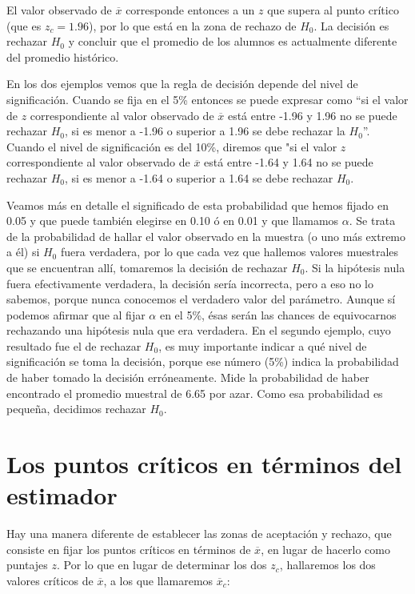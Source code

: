 \documentclass[]{book}
\begin{document}
El valor observado de \(\overline{x}\) corresponde entonces a un \(z\) que
supera al punto crítico (que es \(z_{c}=1.96\)), por lo que está en la zona de rechazo de \(H_{0}\). La decisión es rechazar \(H_{0}\) y concluir que el promedio de los alumnos es actualmente diferente del promedio histórico.

En los dos ejemplos vemos que la regla de decisión depende del nivel de
significación. Cuando se fija en el 5\% entonces se puede expresar como
``si el valor de \(z\) correspondiente al valor observado de \(\overline{x}\) está entre -1.96 y 1.96 no se puede rechazar \(H_{0}\), si es menor a -1.96 o superior a 1.96 se debe rechazar la \(H_{0}\)''. Cuando el nivel de significación es del 10\%, diremos que "si el valor \(z\) correspondiente al valor observado de \(\overline{x}\) está entre -1.64 y 1.64 no se puede rechazar \(H_{0}\), si es menor a -1.64 o superior a 1.64 se debe rechazar \(H_{0}\).

Veamos más en detalle el significado de esta probabilidad que hemos
fijado en 0.05 y que puede también elegirse en 0.10 ó en 0.01 y que
llamamos \(\alpha\). Se trata de la probabilidad de hallar el valor observado en la muestra (o uno más extremo a él) si \(H_{0}\) fuera verdadera, por lo que cada vez que hallemos valores muestrales que se encuentran allí, tomaremos la decisión de rechazar \(H_{0}\). Si la hipótesis nula fuera efectivamente verdadera, la decisión sería incorrecta, pero a eso no lo sabemos, porque nunca conocemos el verdadero valor del parámetro. Aunque sí podemos afirmar que al fijar \(\alpha\) en el 5\%, ésas serán las chances de equivocarnos rechazando una hipótesis nula que era verdadera. En el
segundo ejemplo, cuyo resultado fue el de rechazar \(H_{0}\), es muy
importante indicar a qué nivel de significación se toma la decisión,
porque ese número (5\%) indica la probabilidad de haber tomado la
decisión erróneamente. Mide la probabilidad de haber encontrado el
promedio muestral de 6.65 por azar. Como esa probabilidad es pequeña,
decidimos rechazar \(H_{0}\).

\hypertarget{los-puntos-cruxedticos-en-tuxe9rminos-del-estimador}{%
\section{Los puntos críticos en términos del estimador}\label{los-puntos-cruxedticos-en-tuxe9rminos-del-estimador}}

Hay una manera diferente de establecer las zonas de aceptación y
rechazo, que consiste en fijar los puntos críticos en términos de
\(\overline{x}\), en lugar de hacerlo como puntajes \(z\). Por lo que en lugar
de determinar los dos \(z_{c}\), hallaremos los dos valores críticos de
\(\overline{x}\), a los que llamaremos \({\overline{x}}_{c}\):
\end{document}
